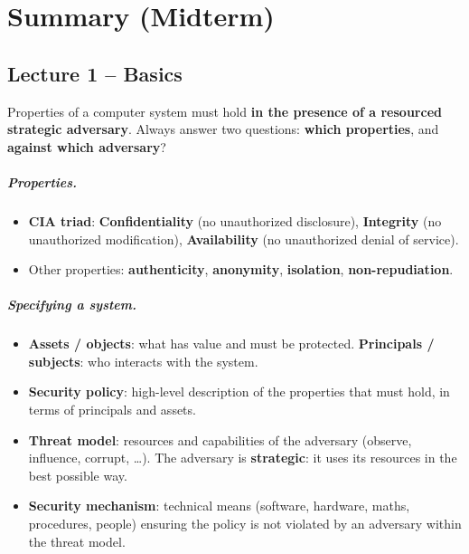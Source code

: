 \newpage
\chapter{Summary (Midterm)}
\label{ch:summary}

\section{Lecture 1 -- Basics}

\begin{definition}
Properties of a computer system must hold \textbf{in the presence of a resourced strategic adversary}. Always answer two questions: \textbf{which properties}, and \textbf{against which adversary}?
\end{definition}

\paragraph{Properties.}
\begin{itemize}
    \item \textbf{CIA triad}: \textbf{Confidentiality} (no unauthorized disclosure), \textbf{Integrity} (no unauthorized modification), \textbf{Availability} (no unauthorized denial of service).
    \item Other properties: \textbf{authenticity}, \textbf{anonymity}, \textbf{isolation}, \textbf{non-repudiation}.
\end{itemize}

\paragraph{Specifying a system.}
\begin{itemize}
    \item \textbf{Assets / objects}: what has value and must be protected. \textbf{Principals / subjects}: who interacts with the system.
    \item \textbf{Security policy}: high-level description of the properties that must hold, in terms of principals and assets.
    \item \textbf{Threat model}: resources and capabilities of the adversary (observe, influence, corrupt, \dots). The adversary is \textbf{strategic}: it uses its resources in the best possible way.
    \item \textbf{Security mechanism}: technical means (software, hardware, maths, procedures, people) ensuring the policy is not violated by an adversary within the threat model.
\end{itemize}

